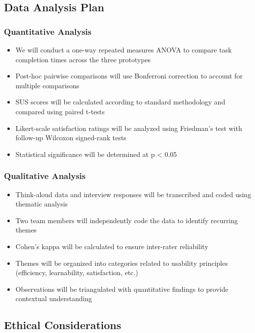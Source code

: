 \documentclass[
	letterpaper, %
]{jdf}
\begin{document}
\begin{sloppypar}
\subsection{Data Analysis Plan}

\subsubsection{Quantitative Analysis}
\begin{itemize}
    \item We will conduct a one-way repeated measures ANOVA to compare task completion times across the three prototypes
    \item Post-hoc pairwise comparisons will use Bonferroni correction to account for multiple comparisons
    \item SUS scores will be calculated according to standard methodology and compared using paired t-tests
    \item Likert-scale satisfaction ratings will be analyzed using Friedman's test with follow-up Wilcoxon signed-rank tests
    \item Statistical significance will be determined at p < 0.05
\end{itemize}

\subsubsection{Qualitative Analysis}
\begin{itemize}
    \item Think-aloud data and interview responses will be transcribed and coded using thematic analysis
    \item Two team members will independently code the data to identify recurring themes
    \item Cohen's kappa will be calculated to ensure inter-rater reliability
    \item Themes will be organized into categories related to usability principles (efficiency, learnability, satisfaction, etc.)
    \item Observations will be triangulated with quantitative findings to provide contextual understanding
\end{itemize}

\subsection{Ethical Considerations}


\end{sloppypar}
\end{document}
